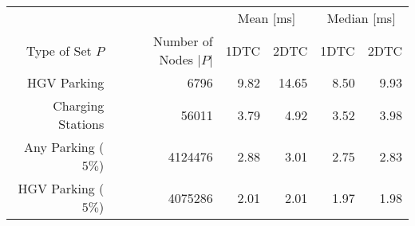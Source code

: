 \begin{tabular}{rrrrrr}
	\toprule
	                    &                       & \multicolumn{2}{c}{Mean [\si{\milli\second}]} & \multicolumn{2}{c}{Median [\si{\milli\second}]}               \\
	Type of Set $P$     & Number of Nodes $|P|$ & 1DTC                                          & 2DTC                                            & 1DTC & 2DTC \\
	\midrule
	HGV Parking         & 6796                     & 9.82                                             & 14.65                                               & 8.50    & 9.93    \\
	Charging Stations   & 56011                     & 3.79                                             & 4.92                                               & 3.52    & 3.98    \\
	Any Parking ($5\%$) & 4124476                     & 2.88                                             & 3.01                                               & 2.75    & 2.83    \\
	HGV Parking ($5\%$) & 4075286                     & 2.01                                             & 2.01                                               & 1.97    & 1.98    \\
	\bottomrule
\end{tabular}
